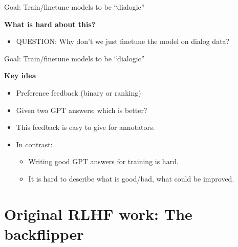 \begin{vbframe}{Goal: Train/finetune models to be ``dialogic''}

\vfill

\textbf{What is hard about this?}

	\begin{itemize}
		\item QUESTION: Why don't we just finetune the model
		on dialog data?
	\end{itemize}

\vfill

\end{vbframe}

\begin{vbframe}{Goal: Train/finetune models to be ``dialogic''}

\vfill

\textbf{Key idea}

	\begin{itemize}
		\item Preference feedback (binary or
                  ranking)
                  \item Given two GPT answers: which is
                    better?
                    \item This feedback is easy to give for
                      annotators.
                      \item In contrast:
	\begin{itemize}
                    \item Writing good GPT answers for
                      training is hard.
                    \item It is hard to describe what is good/bad,
                      what could be improved.
	\end{itemize}
	\end{itemize}

\vfill

\end{vbframe}




\section{Original RLHF work: The backflipper}

